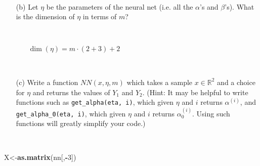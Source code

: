 \documentclass[]{article}
\newenvironment{Shaded}{\begin{snugshade}}{\end{snugshade}}
\newcommand{\KeywordTok}[1]{\textcolor[rgb]{0.13,0.29,0.53}{\textbf{#1}}}
\newcommand{\DecValTok}[1]{\textcolor[rgb]{0.00,0.00,0.81}{#1}}
\newcommand{\OperatorTok}[1]{\textcolor[rgb]{0.81,0.36,0.00}{\textbf{#1}}}
\newcommand{\NormalTok}[1]{#1}
\begin{document}
~

\begin{itemize} \item[(b)]  Let $\eta$ be the parameters of the neural net (i.e. all the $\alpha$'s and $\beta$'s).  What is the dimension of $\eta$ in terms of $m$?  
 
 \ 
 
 \begin{itemize} \item[ ] \hfil \(\displaystyle \dim\left(\eta\right) = m\cdot(2+3)+2 \)


\end{itemize} 
 \end{itemize}

~

\begin{itemize} \item[(c)] Write a function $NN(x, \eta, m)$ which takes a sample $x \in \mathbb{R}^2$ and a choice for $\eta$ and returns the values of $Y_1$ and $Y_2$.  (Hint:  It may be helpful to write functions such as \verb+get_alpha(eta, i)+, which given $\eta$ and $i$ returns $\alpha^{(i)}$,  and \verb+get_alpha_0(eta, i)+, which given $\eta$ and $i$  returns $\alpha^{(i)}_0$.  Using such functions will greatly simplify your code.)
  
 
 \ 
 

 \end{itemize}

\begin{Shaded}
\begin{Highlighting}[]
\NormalTok{X<-}\KeywordTok{as.matrix}\NormalTok{(nn[,}\OperatorTok{-}\DecValTok{3}\NormalTok{])}
\end{Highlighting}
\end{Shaded}
\end{document}
